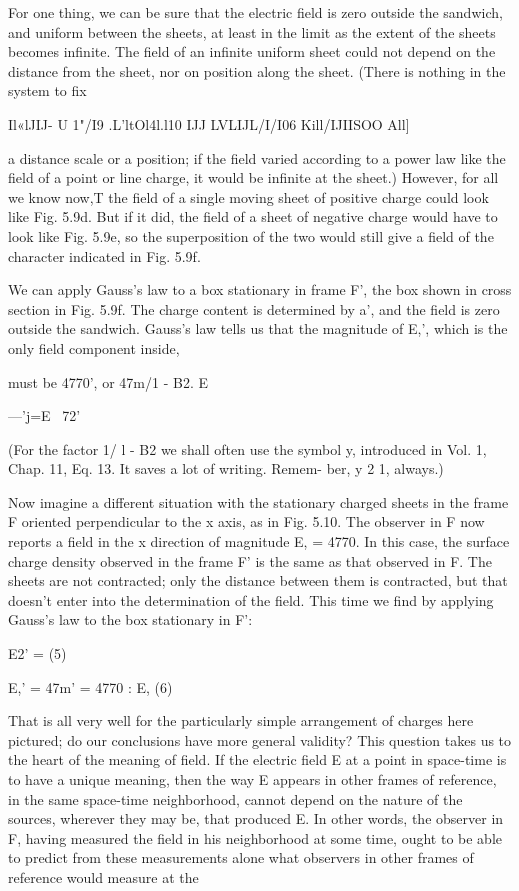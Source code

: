For one thing, we can be sure that the electric field is zero outside
the sandwich, and uniform between the sheets, at least in the limit
as the extent of the sheets becomes infinite. The field of an infinite
uniform sheet could not depend on the distance from the sheet, nor
on position along the sheet. (There is nothing in the system to fix

\/Il«lJIJ- U 1"/I9 .L'ltOl4l.l10 IJJ LVLIJL/I/I06 Kill/IJIISOO All]

a distance scale or a position; if the field varied according to a power
law like the field of a point or line charge, it would be infinite at the
sheet.) However, for all we know now,T the field of a single moving
sheet of positive charge could look like Fig. 5.9d. But if it did, the
field of a sheet of negative charge would have to look like Fig. 5.9e,
so the superposition of the two would still give a field of the character
indicated in Fig. 5.9f.

We can apply Gauss's law to a box stationary in frame F', the box
shown in cross section in Fig. 5.9f. The charge content is determined
by a', and the field is zero outside the sandwich. Gauss's law tells us
that the magnitude of E,', which is the only field component inside,

must be 4770', or 47m/\/1 - B2.
E

---'j=E
\  72'

(For the factor 1/ \/l - B2 we shall often use the symbol y, introduced
in Vol. 1, Chap. 11, Eq. 13. It saves a lot of writing. Remem-
ber, y 2 1, always.)

Now imagine a different situation with the stationary charged
sheets in the frame F oriented perpendicular to the x axis, as in
Fig. 5.10. The observer in F now reports a field in the x direction of
magnitude E, = 4770. In this case, the surface charge density observed
in the frame F' is the same as that observed in F. The sheets
are not contracted; only the distance between them is contracted, but
that doesn't enter into the determination of the field. This time we
find by applying Gauss's law to the box stationary in F':

\begin{equation}
\end{equation}
E2' = (5)

\begin{equation}
\end{equation}
E,' = 47m' = 4770 : E, (6)

That is all very well for the particularly simple arrangement of
charges here pictured; do our conclusions have more general validity?
This question takes us to the heart of the meaning of field. If the
electric field E at a point in space-time is to have a unique meaning,
then the way E appears in other frames of reference, in the same
space-time neighborhood, cannot depend on the nature of the
sources, wherever they may be, that produced E. In other words,
the observer in F, having measured the field in his neighborhood at
some time, ought to be able to predict from these measurements alone
what observers in other frames of reference would measure at the

